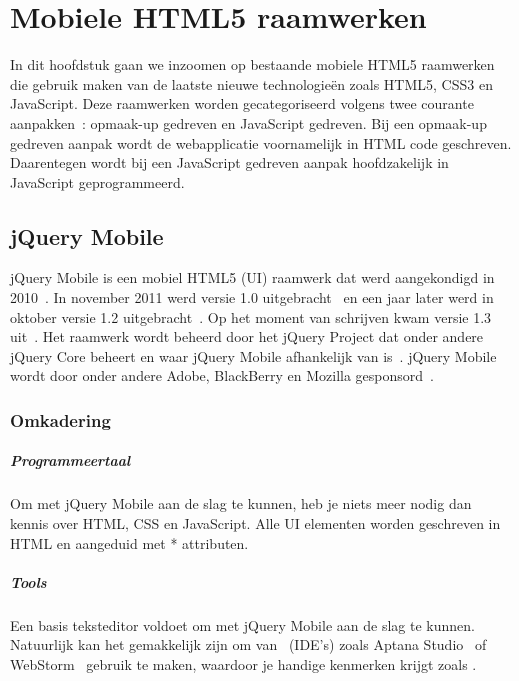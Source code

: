 \chapter{Mobiele HTML5 raamwerken}
\label{chap:mobiele-html5-raamwerken}
In dit hoofdstuk gaan we inzoomen op bestaande mobiele HTML5 raamwerken die gebruik maken van de laatste nieuwe technologieën zoals HTML5, CSS3 en JavaScript. Deze raamwerken worden gecategoriseerd volgens twee courante aanpakken~\cite{Oeflman2011}: opmaak-up gedreven en JavaScript gedreven. Bij een opmaak-up gedreven aanpak wordt de webapplicatie voornamelijk in HTML code geschreven. Daarentegen wordt bij een JavaScript gedreven aanpak hoofdzakelijk in JavaScript geprogrammeerd.

\section{jQuery Mobile}
jQuery Mobile is een mobiel HTML5  (UI) raamwerk dat werd aangekondigd in 2010~\cite{Resig2010}. In november 2011 werd versie 1.0 uitgebracht~\cite{Parker2011} en een jaar later werd in oktober versie 1.2 uitgebracht~\cite{Parker2012}. Op het moment van schrijven kwam versie 1.3 uit~\cite{Parker2013a}. Het raamwerk wordt beheerd door het jQuery Project dat onder andere jQuery Core beheert en waar jQuery Mobile afhankelijk van is~\cite{JQuery2012}. jQuery Mobile wordt door onder andere Adobe, BlackBerry en Mozilla gesponsord~\cite{JQuery2012a}.

\subsection{Omkadering}
\paragraph{Programmeertaal}
Om met jQuery Mobile aan de slag te kunnen, heb je niets meer nodig dan kennis over HTML, CSS en JavaScript. Alle UI elementen worden geschreven in HTML en aangeduid met * attributen.

\paragraph{Tools}
Een basis teksteditor voldoet om met jQuery Mobile aan de slag te kunnen. Natuurlijk kan het gemakkelijk zijn om van ~(IDE's) zoals Aptana Studio~\cite{Aptana2012} of WebStorm~\cite{JetBrains2012} gebruik te maken, waardoor je handige kenmerken krijgt zoals .

